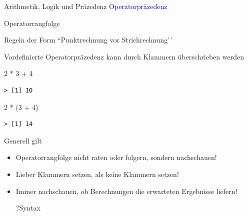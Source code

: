 \documentclass[
  8pt,
  ignorenonframetext,
]{beamer}
\newenvironment{Shaded}{\begin{snugshade}}{\end{snugshade}}
\newcommand{\DecValTok}[1]{\textcolor[rgb]{0.00,0.00,0.81}{#1}}
\newcommand{\NormalTok}[1]{#1}
\newcommand{\SpecialCharTok}[1]{\textcolor[rgb]{0.00,0.00,0.00}{#1}}
\begin{document}
\begin{frame}[fragile]{Arithmetik, Logik und Präzedenz}
\protect\hypertarget{arithmetik-logik-und-pruxe4zedenz-4}{}
\textcolor{darkblue}{Operatorpräzedenz} \small

Operatorrangfolge

Regeln der Form ``Punktrechnung vor Strichrechnung'\,'

Vordefinierte Operatorpräzedenz kann durch Klammern überschrieben werden

\begin{Shaded}
\begin{Highlighting}[]
\DecValTok{2} \SpecialCharTok{*} \DecValTok{3} \SpecialCharTok{+} \DecValTok{4}
\end{Highlighting}
\end{Shaded}

\begin{verbatim}
> [1] 10
\end{verbatim}

\begin{Shaded}
\begin{Highlighting}[]
\DecValTok{2} \SpecialCharTok{*}\NormalTok{ (}\DecValTok{3} \SpecialCharTok{+} \DecValTok{4}\NormalTok{)}
\end{Highlighting}
\end{Shaded}

\begin{verbatim}
> [1] 14
\end{verbatim}

Generell gilt

\begin{itemize}
\item
  Operatorrangfolge nicht raten oder folgern, sondern nachschauen!
\item
  Lieber Klammern setzen, als keine Klammern setzen!
\item
  Immer nachschauen, ob Berechnungen die erwarteten Ergebnisse liefern!

\begin{Shaded}
\begin{Highlighting}[]
\NormalTok{?Syntax}
\end{Highlighting}
\end{Shaded}
\end{itemize}
\end{frame}
\end{document}
